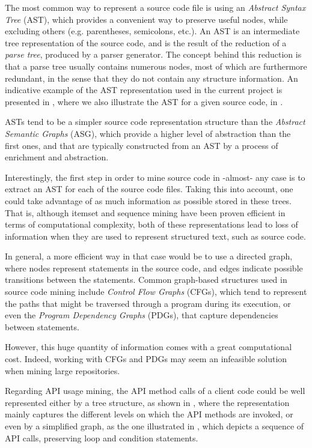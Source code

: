 The most common way to represent a source code file is using an \textit{Abstract Syntax Tree} (AST), which provides a convenient way to preserve useful nodes, while excluding others (e.g. parentheses, semicolons, etc.). An AST is an intermediate tree representation of the source code, and is the result of the reduction of a \textit{parse tree}, produced by a parser generator. The concept behind this reduction is that a parse tree usually contains numerous nodes, most of which are furthermore redundant, in the sense that they do not contain any structure information. An indicative example of the AST representation used in the current project is presented in , where we also illustrate the AST for a given source code, in .

ASTs tend to be a simpler source code representation structure than the \textit{Abstract Semantic Graphs} (ASG), which provide a higher level of abstraction than the first ones, and that are typically constructed from an AST by a process of enrichment and abstraction.

Interestingly, the first step in order to mine source code  in -almost- any case is to extract an AST for each of the source code files. Taking this into account, one could take advantage of as much information as possible stored in these trees. That is, although itemset and sequence mining have been proven efficient in terms of computational complexity, both of these representations lead to loss of information when they are used to represent structured text, such as source code.

In general, a more efficient way in that case would be to use a directed graph, where nodes represent statements in the source code, and edges indicate possible transitions between the statements. Common graph-based structures used in source code mining include \textit{Control Flow Graphs} (CFGs), which tend to represent the paths that might be traversed through a program during its execution, or even the \textit{Program Dependency Graphs} (PDGs), that capture dependencies between statements.

However, this huge quantity of information comes with a great computational cost. Indeed, working with CFGs and PDGs may seem an infeasible solution when mining large repositories.

Regarding API usage mining, the API method calls of a client code could be well represented either by a tree structure, as shown in , where the representation mainly captures the different levels on which the API methods are invoked, or even by a simplified graph, as the one illustrated in , which depicts a sequence of API calls, preserving loop and condition statements.

